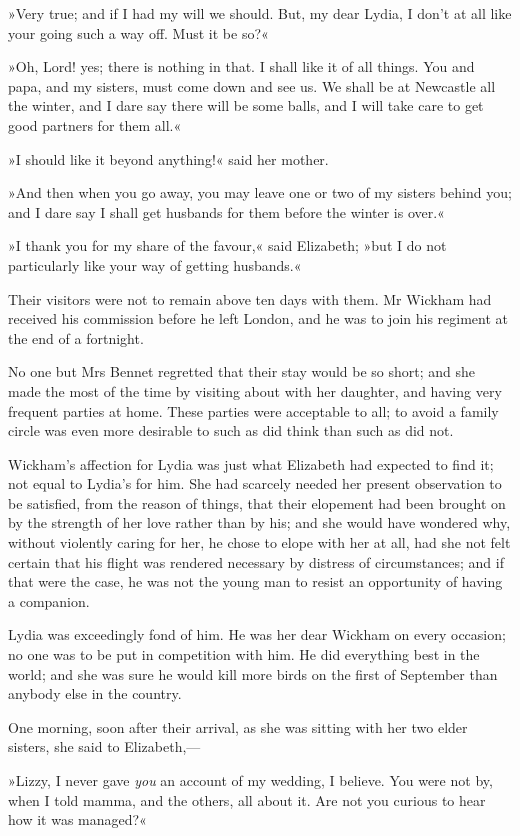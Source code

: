 »Very true; and if I had my will we should. But, my dear Lydia, I don't at all like your going such a way off. Must it be so?«

»Oh, Lord! yes; there is nothing in that. I shall like it of all things. You and papa, and my sisters, must come down and see us. We shall be at Newcastle all the winter, and I dare say there will be some balls, and I will take care to get good partners for them all.«

»I should like it beyond anything!« said her mother.

»And then when you go away, you may leave one or two of my sisters behind you; and I dare say I shall get husbands for them before the winter is over.«

»I thank you for my share of the favour,« said Elizabeth; »but I do not particularly like your way of getting husbands.«

Their visitors were not to remain above ten days with them. Mr Wickham had received his commission before he left London, and he was to join his regiment at the end of a fortnight.

No one but Mrs Bennet regretted that their stay would be so short; and she made the most of the time by visiting about with her daughter, and having very frequent parties at home. These parties were acceptable to all; to avoid a family circle was even more desirable to such as did think than such as did not.

Wickham's affection for Lydia was just what Elizabeth had expected to find it; not equal to Lydia's for him. She had scarcely needed her present observation to be satisfied, from the reason of things, that their elopement had been brought on by the strength of her love rather than by his; and she would have wondered why, without violently caring for her, he chose to elope with her at all, had she not felt certain that his flight was rendered necessary by distress of circumstances; and if that were the case, he was not the young man to resist an opportunity of having a companion.

Lydia was exceedingly fond of him. He was her dear Wickham on every occasion; no one was to be put in competition with him. He did everything best in the world; and she was sure he would kill more birds on the first of September than anybody else in the country.

One morning, soon after their arrival, as she was sitting with her two elder sisters, she said to Elizabeth,—

»Lizzy, I never gave \textit{you} an account of my wedding, I believe. You were not by, when I told mamma, and the others, all about it. Are not you curious to hear how it was managed?«

